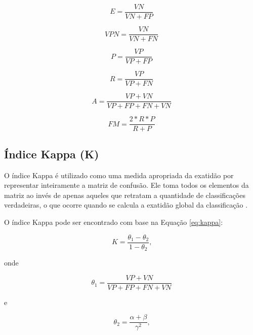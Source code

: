 \begin{equation}
  \label{eq:especificidade}
  E=\dfrac{VN}{VN+FP}
\end{equation}

\begin{equation}
  \label{eq:valor_preditivo_negativo}
  VPN=\dfrac{VN}{VN+FN}
\end{equation}

\begin{equation}
  \label{eq:precisao}
  P=\dfrac{VP}{VP+FP}
\end{equation}

\begin{equation}
  \label{eq:recall}
  R=\dfrac{VP}{VP+FN}
\end{equation}

\begin{equation}
  \label{eq:acuracia}
  A=\dfrac{VP+VN}{VP+FP+FN+VN}
\end{equation}

\begin{equation}
  \label{eq:f_measure}
  FM=\dfrac{2*R*P}{R+P}
\end{equation}


\subsection{Índice Kappa (K)} %
\label{sub:_ndice_kappa_}

O índice Kappa é utilizado como uma medida apropriada da exatidão por representar inteiramente a matriz de confusão. Ele toma todos os elementos da matriz ao invés de apenas aqueles que retratam a quantidade de classificações verdadeiras, o que ocorre quando se calcula a exatidão global da classificação \citep{Jnl605963009}.

O índice Kappa pode ser encontrado com base na Equação \ref{eq:kappa}:

\begin{equation}
  \label{eq:kappa}
  K=\dfrac{\theta_{1}-\theta_{2}}{1-\theta_{2}}\text{,}
\end{equation}

\noindent onde

\begin{equation}
  \label{eq:theta_1}
  \theta_{1}=\dfrac{VP+VN}{VP+FP+FN+VN}
\end{equation}

\noindent e

\begin{equation}
  \label{eq:theta_2}
  \theta_{2}=\dfrac{\alpha+\beta}{\gamma^{2}}\text{,}
\end{equation}

